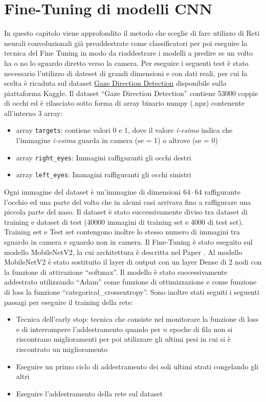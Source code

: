 \documentclass[12pt,a4paper,openright,twoside]{book}
\begin{document}
\section{Fine-Tuning di modelli CNN}
\label{chap:mobilenetv2_ft}
In questo capitolo viene approfondito il metodo che sceglie di fare utilizzo di Reti neurali convoluzionali già preaddestrate come classificatori per poi eseguire la tecnica del Fine Tuning in modo da riaddestrare i modelli a predire se un volto ha o no lo sguardo diretto verso la camera.
Per eseguire i seguenti test è stato necessario l'utilizzo di dateset di grandi dimensioni e con dati reali, per cui la scelta è ricaduta sul dataset \href{https://www.kaggle.com/datasets/estopadilla/gaze-direction-detection}{Gaze Direction Detection} disponibile sulla piattaforma Kaggle.
Il dataset ``Gaze Direction Detection'' contiene 53000 coppie di occhi ed è rilasciato sotto forma di array binario numpy (.npz) contenente all'interno 3 array: \begin{itemize}
    \item array \texttt{targets}: contiene valori 0 e 1, dove il valore \textit{i-esimo} indica che l'immagine \textit{i-esima} guarda in camera (se = 1) o altrove (se = 0)
    \item array \texttt{right\_eyes}: Immagini raffiguranti gli occhi destri
    \item array \texttt{left\_eyes}: Immagini raffiguranti gli occhi sinistri
\end{itemize}
Ogni immagine del dataset è un'immagine di dimensioni \(64 \cdot 64\) raffigurante l'occhio ed una parte del volto che in alcuni casi arrivava fino a raffigurare una piccola parte del naso.
Il dataset è stato successivamente diviso tra dataset di training e dataset di test (40000 immagini di training set e 4000 di test set).
Training set e Test set contengono inoltre lo stesso numero di immagini tra sguardo in camera e sguardo non in camera.
Il Fine-Tuning è stato eseguito sul modello MobileNetV2, la cui architettura è descritta nel Paper \cite[MobileNetV2: Inverted Residuals and Linear Bottlenecks]{Sandler2018MobileNetV2IR}.
Al modello MobileNetV2 è stato sostituito il layer di output con un layer Dense di 2 nodi con la funzione di attivazione ``softmax''. Il modello è stato successivamente addestrato utilizzando ``Adam'' come funzione di ottimizzazione e come funzione di loss la funzione ``categorical\_crossentropy''.
Sono inoltre stati seguiti i seguenti passagi per eseguire il training della rete: \begin{itemize}
    \item Tecnica dell'early stop: tecnica che consiste nel monitorare la funzione di loss e di interrompere l'addestramento quando per \(n\) epoche di fila non si riscontrano miglioramenti per poi utilizzare gli ultimi pesi in cui si è riscontrato un miglioramento
    \item Eseguire un primo ciclo di addestramento dei soli ultimi strati congelando gli altri
    \item Eseguire l'addestramento della rete sul dataset
\end{itemize}
\end{document}
